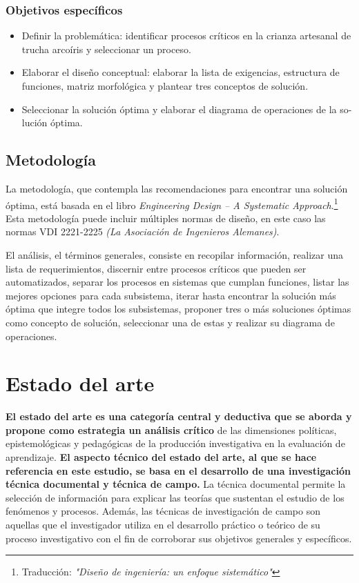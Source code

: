 \subsubsection{Objetivos específicos}

\begin{itemize}
	\item Definir la problemática: identificar procesos críticos en la crianza artesanal de trucha arcoíris y seleccionar un proceso.
	\item Elaborar el diseño conceptual: elaborar la lista de exigencias, estructura de funciones, matriz morfológica y plantear tres conceptos de solución.
	\item Seleccionar la solución óptima y elaborar el diagrama de operaciones de la so-lución óptima. 
\end{itemize}

\subsection{Metodología}

La metodología, que contempla las recomendaciones para encontrar una solución óptima, está basada en el libro \textit{Engineering Design – A Systematic Approach}.\footnote{Traducción: \textit{"Diseño de ingeniería: un enfoque sistemático"}}  Esta metodología puede incluir múltiples normas de diseño, en este caso las normas VDI 2221-2225 \textit{(La Asociación de Ingenieros Alemanes)}.

El análisis, el términos generales, consiste en recopilar información, realizar una lista de requerimientos, discernir entre procesos críticos que pueden ser automatizados, separar los procesos en sistemas que cumplan funciones, listar las mejores opciones para cada subsistema, iterar hasta encontrar la solución más óptima que integre todos los subsistemas, proponer tres o más soluciones óptimas como concepto de solución, seleccionar una de estas y realizar su diagrama de operaciones.

\section{Estado del arte}
\textbf{El estado del arte es una categoría central y deductiva que se aborda y propone como estrategia un análisis crítico} de las dimensiones políticas, epistemológicas y pedagógicas de la producción investigativa en la evaluación de aprendizaje.\citep{GuevaraPatino2016} \textbf{El aspecto técnico del estado del arte, al que se hace referencia en este estudio, se basa en el desarrollo de una investigación técnica documental y técnica de campo.} La técnica documental permite la selección de información para explicar las teorías que sustentan el estudio de los fenómenos y procesos.\citep{Martinez2003} Además, las técnicas de investigación de campo son aquellas que el investigador utiliza en el desarrollo práctico o teórico de su proceso investigativo con el fin de corroborar sus objetivos generales y específicos.\citep{GuevaraPatino2016}

